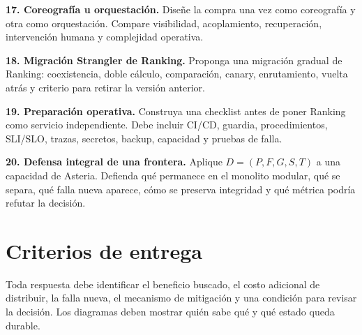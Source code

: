 \documentclass[variant=guia,cover=institutional,mode=screen]{ua-engineering-v6-article}
\begin{document}
\begin{uaexercise}
\textbf{17. Coreografía u orquestación.} Diseñe la compra una vez como coreografía y otra como orquestación. Compare visibilidad, acoplamiento, recuperación, intervención humana y complejidad operativa.
\end{uaexercise}
\begin{uaexercise}
\textbf{18. Migración Strangler de Ranking.} Proponga una migración gradual de Ranking: coexistencia, doble cálculo, comparación, canary, enrutamiento, vuelta atrás y criterio para retirar la versión anterior.
\end{uaexercise}
\begin{uaexercise}
\textbf{19. Preparación operativa.} Construya una checklist antes de poner Ranking como servicio independiente. Debe incluir CI/CD, guardia, procedimientos, SLI/SLO, trazas, secretos, backup, capacidad y pruebas de falla.
\end{uaexercise}
\begin{uaexercise}
\textbf{20. Defensa integral de una frontera.} Aplique $D=(P,F,G,S,T)$ a una capacidad de Asteria. Defienda qué permanece en el monolito modular, qué se separa, qué falla nueva aparece, cómo se preserva integridad y qué métrica podría refutar la decisión.
\end{uaexercise}
\section{Criterios de entrega}
Toda respuesta debe identificar el beneficio buscado, el costo adicional de distribuir, la falla nueva, el mecanismo de mitigación y una condición para revisar la decisión. Los diagramas deben mostrar quién sabe qué y qué estado queda durable.
\end{document}
